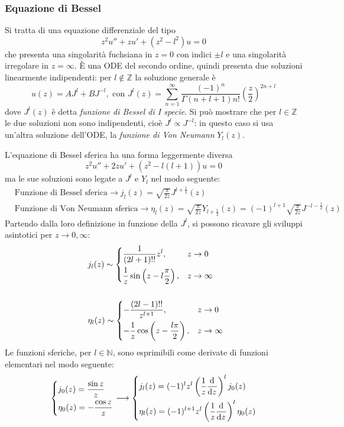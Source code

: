 \subsubsection{Equazione di Bessel}
Si tratta di una equazione differenziale del tipo
$$z^2u'' + zu' +(z^2-l^2)u=0$$
che presenta una singolarità fuchsiana in $z=0$ con indici $\pm l$ e una singolarità irregolare in
$z=\infty$. È una ODE del secondo ordine, quindi presenta due soluzioni linearmente indipendenti:
per $l\not\in\mathbb{Z}$ la soluzione generale è
$$u(z) = AJ^l+BJ^{-l},\text{ con } J^l(z) = \sum_{n=1}^{\infty}\frac{(-1)^n}{\Gamma(n+l+1)n!}
\left(\frac{z}{2}\right)^{2n+l}
$$
dove $J^l(z)$ è detta \textit{funzione di Bessel di I specie}. Si può mostrare che per $l\in\mathbb{Z}$
le due soluzioni non sono indipendenti, cioè $J^l\propto J^{-l}$: in questo caso si usa un'altra
soluzione dell'ODE, la \textit{funzione di Von Neumann} $Y_l(z)$.

L'equazione di Bessel sferica ha una forma leggermente diversa
$$z^2u'' + 2zu' +(z^2-l(l+1))u=0$$
ma le sue soluzioni sono legate a $J^l$ e $Y_l$ nel modo seguente:
\begin{align*}
&\text{Funzione di Bessel sferica} \rightarrow j_l(z) =\sqrt{\frac{\pi}{2z}}J^{l+\frac{1}{2}}(z)\\
&\text{Funzione di Von Neumann sferica} \rightarrow \eta_l(z) =\sqrt{\frac{\pi}{2z}}Y_{l+\frac{1}{2}}(z)=
(-1)^{l+1}\sqrt{\frac{\pi}{2z}}J^{-l-\frac12}(z)
\end{align*}
Partendo dalla loro definizione in funzione della $J^l$, si possono ricavare gli sviluppi asintotici
per $z\to0,\infty$:
\begin{align*}
&j_l(z)\sim
\begin{dcases}
    \frac{1}{(2l+1)!!}z^l,&z\to0\\
    \frac{1}{z}\sin\left(z-l\frac{\pi}{2}
\right),&z\to\infty
\end{dcases}\\\phantom{x}\\
&\eta_l(z)\sim
\begin{dcases}
    -\frac{(2l-1)!!}{z^{l+1}},&z\to0\\
    -\frac{1}{z}\cos\left(z-\frac{l\pi}{2}\right),&z\to\infty
\end{dcases}
\end{align*}
Le funzioni sferiche, per $l\in\mathbb{N}$, sono esprimibili come derivate di funzioni elementari nel modo
seguente:
\begin{align*}
\begin{dcases}
j_0(z) = \frac{\sin z}{z}\\
\eta_0(z)=-\frac{\cos z}{z}
\end{dcases} \longrightarrow
\begin{dcases}
j_l(z) = (-1)^lz^l\left(\frac{1}{z}\dv[]{}{z}\right)^lj_0(z)\\
\eta_l(z)= (-1)^{l+1}z^l \left(\frac{1}{z}\dv[]{}{z}\right)^l\eta_0(z)
\end{dcases}
\end{align*}

